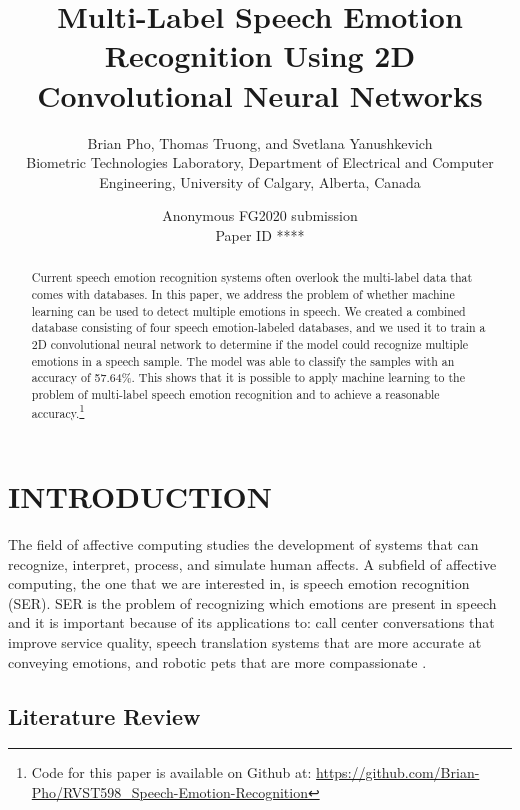 \documentclass[a4paper, 10pt, conference]{ieeeconf}      %
\title{\LARGE \bf
Multi-Label Speech Emotion Recognition Using 2D Convolutional Neural Networks
}
\author{\parbox{16cm}{\centering
    {\large Brian Pho, Thomas Truong, and Svetlana Yanushkevich}\\
    {\normalsize
    Biometric Technologies Laboratory, Department of Electrical and Computer Engineering, University of Calgary, Alberta, Canada\\}}
}
\def\FGPaperID{****} %
\begin{document}
\ifFGfinal
\thispagestyle{empty}
\pagestyle{empty}
\else
\author{Anonymous FG2020 submission\\ Paper ID \FGPaperID \\}
\pagestyle{plain}
\fi
\maketitle


\begin{abstract}

Current speech emotion recognition systems often overlook the multi-label data that comes with databases. In this paper, we address the problem of whether machine learning can be used to detect multiple emotions in speech. We created a combined database consisting of four speech emotion-labeled databases, and we used it to train a 2D convolutional neural network to determine if the model could recognize multiple emotions in a speech sample. The model was able to classify the samples with an accuracy of 57.64\%. This shows that it is possible to apply machine learning to the problem of multi-label speech emotion recognition and to achieve a reasonable accuracy.\footnote{Code for this paper is available on Github at: \url{https://github.com/Brian-Pho/RVST598_Speech-Emotion-Recognition}}

\end{abstract}


\section{INTRODUCTION}

The field of affective computing studies the development of systems that can recognize, interpret, process, and simulate human affects. A subfield of affective computing, the one that we are interested in, is speech emotion recognition (SER). SER is the problem of recognizing which emotions are present in speech and it is important because of its applications to: call center conversations that improve service quality, speech translation systems that are more accurate at conveying emotions, and robotic pets that are more compassionate \cite{Koolagudi2012}.

\subsection{Literature Review}
\end{document}
